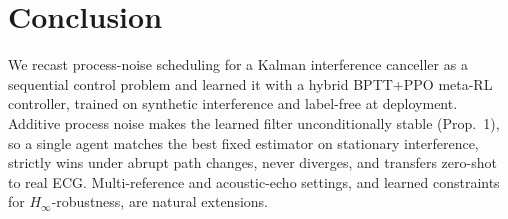 \documentclass[journal]{IEEEtran}
\begin{document}
\section{Conclusion}\label{sec:conclusion}
We recast process-noise scheduling for a Kalman interference canceller as a
sequential control problem and learned it with a hybrid BPTT+PPO meta-RL
controller, trained on synthetic interference and label-free at deployment.
Additive process noise makes the learned filter unconditionally stable
(Prop.~1), so a single agent matches the best fixed estimator on stationary
interference, strictly wins under abrupt path changes, never diverges, and
transfers zero-shot to real ECG. Multi-reference and acoustic-echo settings,
and learned constraints for $H_\infty$-robustness, are natural extensions.

\nocite{widrow1975anc,haykin2014adaptive,sayed2003fundamentals,kwong1992variable,aboulnasr1997robust,casebeer2022metaaf,calabrese2018learning,mismar2019deep,duan2016rl2,wang2016learning,schulman2017ppo,schulman2016gae,kingma2014adam,moody2001mitdb,hochreiter1997lstm,raffin2021sb3,hassibi2001hinfinity}
\balance


\end{document}
